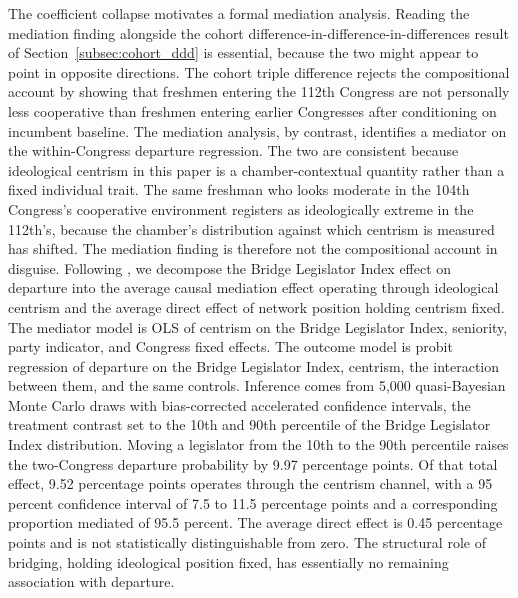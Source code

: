 \documentclass[12pt, a4paper]{article}
\begin{document}
The coefficient collapse motivates a formal mediation analysis. Reading the mediation finding alongside the cohort difference-in-difference-in-differences result of Section~\ref{subsec:cohort_ddd} is essential, because the two might appear to point in opposite directions. The cohort triple difference rejects the compositional account by showing that freshmen entering the 112th Congress are not personally less cooperative than freshmen entering earlier Congresses after conditioning on incumbent baseline. The mediation analysis, by contrast, identifies a mediator on the within-Congress departure regression. The two are consistent because ideological centrism in this paper is a chamber-contextual quantity rather than a fixed individual trait. The same freshman who looks moderate in the 104th Congress's cooperative environment registers as ideologically extreme in the 112th's, because the chamber's distribution against which centrism is measured has shifted. The mediation finding is therefore not the compositional account in disguise. Following \citet{imai2010general}, we decompose the Bridge Legislator Index effect on departure into the average causal mediation effect operating through ideological centrism and the average direct effect of network position holding centrism fixed. The mediator model is OLS of centrism on the Bridge Legislator Index, seniority, party indicator, and Congress fixed effects. The outcome model is probit regression of departure on the Bridge Legislator Index, centrism, the interaction between them, and the same controls. Inference comes from 5,000 quasi-Bayesian Monte Carlo draws with bias-corrected accelerated confidence intervals, the treatment contrast set to the 10th and 90th percentile of the Bridge Legislator Index distribution. Moving a legislator from the 10th to the 90th percentile raises the two-Congress departure probability by 9.97 percentage points. Of that total effect, 9.52 percentage points operates through the centrism channel, with a 95 percent confidence interval of 7.5 to 11.5 percentage points and a corresponding proportion mediated of 95.5 percent. The average direct effect is 0.45 percentage points and is not statistically distinguishable from zero. The structural role of bridging, holding ideological position fixed, has essentially no remaining association with departure.
\end{document}
